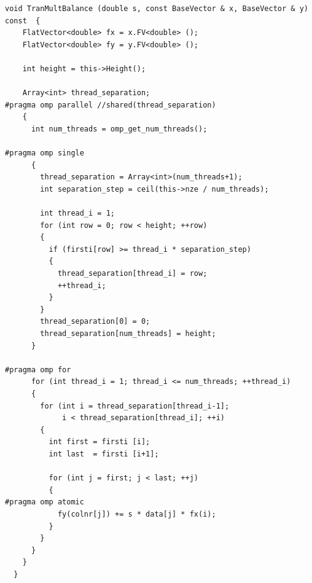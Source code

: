 \documentclass[a4paper,11pt]{scrartcl}
\begin{document}
\begin{lstlisting}
void TranMultBalance (double s, const BaseVector & x, BaseVector & y) const  {
    FlatVector<double> fx = x.FV<double> ();
    FlatVector<double> fy = y.FV<double> ();

    int height = this->Height();

    Array<int> thread_separation;
#pragma omp parallel //shared(thread_separation)
    {
      int num_threads = omp_get_num_threads();

#pragma omp single
      {
        thread_separation = Array<int>(num_threads+1);
        int separation_step = ceil(this->nze / num_threads);

        int thread_i = 1;
        for (int row = 0; row < height; ++row)
        {
          if (firsti[row] >= thread_i * separation_step)
          {
            thread_separation[thread_i] = row;
            ++thread_i;
          }
        }
        thread_separation[0] = 0;
        thread_separation[num_threads] = height;
      }

#pragma omp for
      for (int thread_i = 1; thread_i <= num_threads; ++thread_i)
      {
        for (int i = thread_separation[thread_i-1];
             i < thread_separation[thread_i]; ++i)
        {
          int first = firsti [i];
          int last  = firsti [i+1];

          for (int j = first; j < last; ++j)
          {
#pragma omp atomic
            fy(colnr[j]) += s * data[j] * fx(i);
          }
        }
      }
    }
  }

\end{lstlisting}
\end{document}
